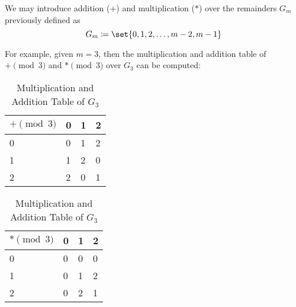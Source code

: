 \begin{remark}
    We may introduce addition ($+$) and multiplication ($\ast$) over the remainders $G_m$ previously defined as
    \begin{equation}
        G_m \coloneqq \set{0, 1, 2, \dots, m - 2, m - 1}
    \end{equation}
    
    For example, given $m = 3$, then the multiplication and addition table of $+ \pmod 3$ and $\ast \pmod 3$ over $G_3$ can be computed:
    \begin{table}[H]
    \centering
    \begin{tabular}{ l | l l l }
        \toprule
        $+ \pmod 3$ & 0 & 1 & 2 \\ 
        \midrule
        0           & 0 & 1 & 2 \\ 
        1           & 1 & 2 & 0 \\ 
        2           & 2 & 0 & 1 \\ 
        \bottomrule
    \end{tabular}
    \quad
    \begin{tabular}{ l | l l l }
        \toprule
        $* \pmod 3$ & 0 & 1 & 2 \\ 
        \midrule
        0           & 0 & 0 & 0 \\ 
        1           & 0 & 1 & 2 \\ 
        2           & 0 & 2 & 1 \\ 
        \bottomrule
    \end{tabular}
    \caption{Multiplication and Addition Table of $G_3$}
    \end{table}
\end{remark}
